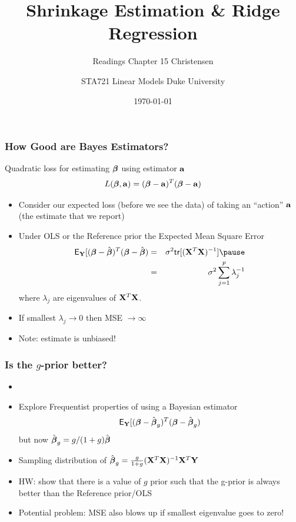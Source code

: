 \documentclass[]{beamer}\usepackage[]{graphicx}\usepackage[]{color}
\title{Shrinkage Estimation \& Ridge Regression}
\subtitle{Readings Chapter 15 Christensen}
\institute{Merlise Clyde}
\author{STA721 Linear Models Duke University}
\date{\today}
\begin{document}
\maketitle

\begin{frame}
  \frametitle{How Good are Bayes Estimators?}
Quadratic loss for estimating  $\boldsymbol{\beta}$ using estimator $\mathbf{a}$
$$ L(\boldsymbol{\beta}, \mathbf{a}) =  ( \boldsymbol{\beta} - \mathbf{a})^T(\boldsymbol{\beta} -\mathbf{a})$$ \pause

\begin{itemize}
\item Consider our expected loss (before we see the data) of taking an
``action'' $\mathbf{a}$ (the estimate that we report)\pause
\item Under OLS or the  Reference prior the Expected Mean Square Error  \pause
  \begin{eqnarray*}
\E_\Y[( \b - \bhat)^T(\b -\bhat) & = &\sigma^2
  \tr[(\X^T\X)^{-1}] \pause \\
 & = & \sigma^2 \sum_{j=1}^p \lambda_j^{-1}
  \end{eqnarray*}
where $\lambda_j$ are eigenvalues of $\mathbf{X}^T\mathbf{X}$.
\pause
\item If smallest $\lambda_j \to 0$ then MSE  $\to \infty$
\item Note: estimate is unbiased!
\end{itemize}
\end{frame}

\begin{frame}
  \frametitle{Is the $g$-prior better?}

\begin{itemize}
  \item

\item Explore Frequentist properties of using a Bayesian estimator
$$\textsf{E}_{\mathbf{Y}}[( \boldsymbol{\beta} - \hat{\boldsymbol{\beta}}_g)^T(\boldsymbol{\beta} -\hat{\boldsymbol{\beta}}_g)$$
but now $\hat{\boldsymbol{\beta}}_g = g/(1+g) \hat{\boldsymbol{\beta}}$  \pause

\item Sampling distribution of $\hat{\boldsymbol{\beta}}_g  = \frac{g}{1+g}(\mathbf{X}^T\mathbf{X})^{-1} \mathbf{X}^T\mathbf{Y}$  \pause
\item HW: show that there is a value of $g$ prior such that the g-prior is always better than the Reference prior/OLS

\item Potential problem: MSE also blows up if smallest eigenvalue goes to zero!
\end{itemize}
\end{frame}
\end{document}
